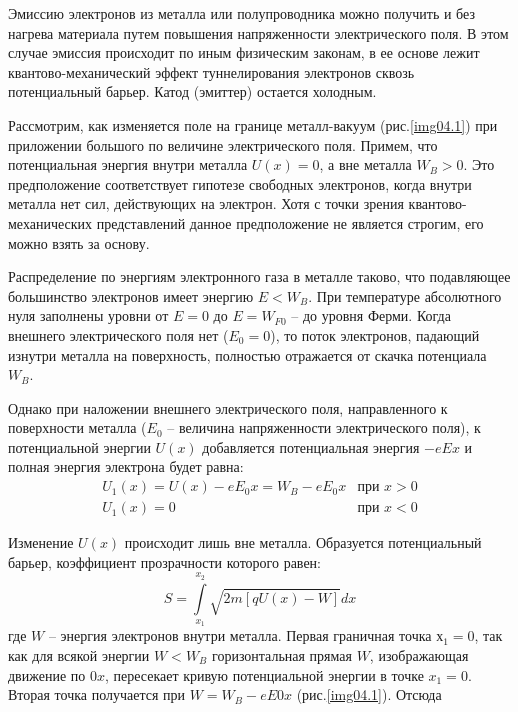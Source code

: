 
Эмиссию электронов из металла или полупроводника можно получить и без нагрева 
материала путем повышения напряженности электрического поля. В этом случае 
эмиссия происходит по иным физическим законам, в ее основе лежит 
квантово-механический эффект туннелирования электронов сквозь потенциальный 
барьер. Катод (эмиттер) остается холодным.

Рассмотрим, как изменяется поле на границе металл-вакуум (рис.\ref{img04.1}) 
при приложении большого по величине электрического поля. Примем, что 
потенциальная энергия внутри металла \( U(x) = 0 \), а вне металла 
\( W_B > 0 \). Это предположение соответствует гипотезе свободных электронов, 
когда внутри металла нет сил, действующих на электрон. Хотя с точки зрения 
квантово-механических представлений данное предположение не является строгим, 
его можно взять за основу.

Распределение по энергиям электронного газа в металле таково, что подавляющее 
большинство электронов имеет энергию \( E < W_B \). При температуре 
абсолютного нуля заполнены уровни от \( E = 0 \) до \( E = W_{F0} \) -- до 
уровня Ферми. Когда внешнего электрического поля нет (\( E_0 = 0 \)), то поток 
электронов, падающий изнутри металла на поверхность, полностью отражается от 
скачка потенциала \( W_B \).

Однако при наложении внешнего электрического поля, направленного к поверхности 
металла (\( E_0 \) -- величина напряженности электрического поля), к 
потенциальной энергии \( U(x) \) добавляется потенциальная энергия \( -eEx \) 
и полная энергия электрона будет равна:
\begin{equation}
	\begin{array}{cr}
		U_1(x) = U(x) - eE_0 x = W_B - eE_0 x & \text{при } x > 0 \\
		U_1(x) = 0 & \text{при } x < 0
	\end{array}
	\label{eq04.1.10}
\end{equation}
 
Изменение \( U(x) \) происходит лишь вне металла. Образуется потенциальный 
барьер, коэффициент прозрачности которого равен:
\begin{equation}
	S = \int\limits_{x_1}^{x_2} \sqrt{2m[qU(x)-W]}dx
	\label{eq04.1.11}
\end{equation}
где \( W \) -- энергия электронов внутри металла. Первая граничная точка 
\( х_1 = 0 \), так как для всякой энергии \( W < W_B \) горизонтальная прямая 
\( W \), изображающая движение по \( 0x \), пересекает кривую потенциальной 
энергии в точке \( x_1 = 0 \). Вторая точка получается при 
\( W = W_B - eE0x \) (рис.\ref{img04.1}). Отсюда

